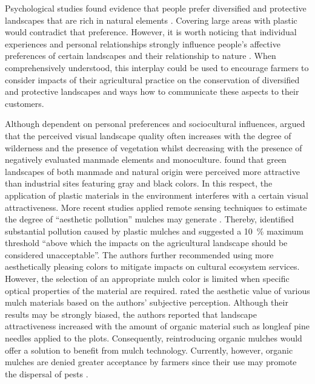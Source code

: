 Psychological studies found evidence that people prefer diversified and protective landscapes that are rich in natural elements \citep[for example][]{KaplanRestorative1995,LohrResponses2006}. Covering large areas with plastic would contradict that preference. However, it is worth noticing that individual experiences and personal relationships strongly influence people's affective preferences of certain landscapes and their relationship to nature \citep[for example][]{HunzikerSpace2007,StrumseDemographic1996}. When comprehensively understood, this interplay could be used to encourage farmers to consider impacts of their agricultural practice on the conservation of diversified and protective landscapes and ways how to communicate these aspects to their customers.

Although dependent on personal preferences and sociocultural influences, \citet{ArriazaAssessing2004} argued that the perceived visual landscape quality often increases with the degree of wilderness and the presence of vegetation whilst decreasing with the presence of negatively evaluated manmade elements and monoculture. \citet{YaoAssessing2011} found that green landscapes of both manmade and natural origin were perceived more attractive than industrial sites featuring gray and black colors. In this respect, the application of plastic materials in the environment interferes with a certain visual attractiveness. More recent studies applied remote sensing techniques to estimate the degree of ``aesthetic pollution'' mulches may generate \citep{LevinRemote2007,PicunoAnalysis2011}. Thereby, \citet{PicunoAnalysis2011} identified substantial pollution caused by plastic mulches and suggested a \SI{10}{\percent} maximum threshold ``above which the impacts on the agricultural landscape should be considered unacceptable''. The authors further recommended using more aesthetically pleasing colors to mitigate impacts on cultural ecosystem services. However, the selection of an appropriate mulch color is limited when specific optical properties of the material are required. \citet{SkrochMulches1992} rated the aesthetic value of various mulch materials based on the authors' subjective perception.
Although their results may be strongly biased, the authors reported that landscape attractiveness increased with the amount of organic material such as longleaf pine needles applied to the plots. Consequently, reintroducing organic mulches would offer a solution to benefit from mulch technology. Currently, however, organic mulches are denied greater acceptance by farmers \citep{GoldbergerBarriers2015} since their use may promote the dispersal of pests \citep{HowardOrganic1998}.

